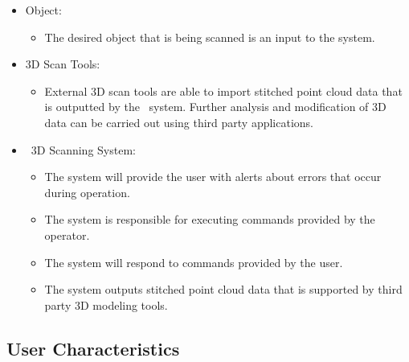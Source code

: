 \documentclass[12pt]{article}
\begin{document}
\begin{itemize}
\item Object:
\begin{itemize}
\item The desired object that is being scanned is an input to the system.
\end{itemize}
\end{itemize}

\begin{itemize}
\item 3D Scan Tools:
\begin{itemize}
\item External 3D scan tools are able to import stitched point cloud data that is outputted by the \progname\ system. Further analysis and modification of 3D data can be carried out using third party applications.
\end{itemize}
\end{itemize}

\begin{itemize}
\item \progname\ 3D Scanning System:
\begin{itemize}
\item The system will provide the user with alerts about errors that occur during operation.
\item The system is responsible for executing commands provided by the operator.
\item The system will respond to commands provided by the user.
\item The system outputs stitched point cloud data that is supported by third party 3D modeling tools.
\end{itemize}
\end{itemize}

\subsection{User Characteristics} \label{SecUserCharacteristics}

  
\end{document}
